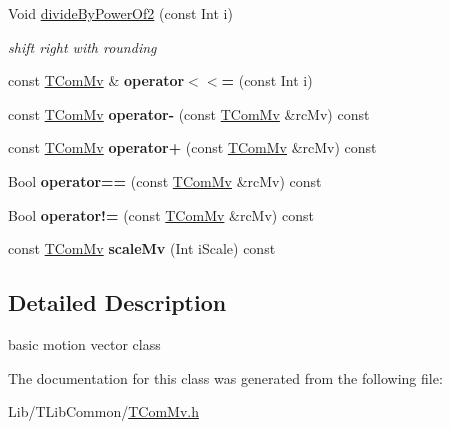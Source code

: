 \begin{DoxyCompactItemize}
\item 
\mbox{\label{class_t_com_mv_ac65379667de620878ffee5956f4b0862}} 
Void \hyperlink{class_t_com_mv_ac65379667de620878ffee5956f4b0862}{divide\+By\+Power\+Of2} (const Int i)
\begin{DoxyCompactList}\small\item\em shift right with rounding \end{DoxyCompactList}\item 
\mbox{\label{class_t_com_mv_a8f0c29162ea488bbb7688e47338b4da0}} 
const \hyperlink{class_t_com_mv}{T\+Com\+Mv} \& {\bfseries operator$<$$<$=} (const Int i)
\item 
\mbox{\label{class_t_com_mv_ac92eef6139ac791bb2e5eb5a4850b9a4}} 
const \hyperlink{class_t_com_mv}{T\+Com\+Mv} {\bfseries operator-\/} (const \hyperlink{class_t_com_mv}{T\+Com\+Mv} \&rc\+Mv) const
\item 
\mbox{\label{class_t_com_mv_a3430bf4109b589453164ac9f53791079}} 
const \hyperlink{class_t_com_mv}{T\+Com\+Mv} {\bfseries operator+} (const \hyperlink{class_t_com_mv}{T\+Com\+Mv} \&rc\+Mv) const
\item 
\mbox{\label{class_t_com_mv_a343f4a9ae678a94960813e603edc709a}} 
Bool {\bfseries operator==} (const \hyperlink{class_t_com_mv}{T\+Com\+Mv} \&rc\+Mv) const
\item 
\mbox{\label{class_t_com_mv_a17bb192264a070e57bb0614f4a410ff8}} 
Bool {\bfseries operator!=} (const \hyperlink{class_t_com_mv}{T\+Com\+Mv} \&rc\+Mv) const
\item 
\mbox{\label{class_t_com_mv_a49e68a254a4d0bcffc616f9d6f60b859}} 
const \hyperlink{class_t_com_mv}{T\+Com\+Mv} {\bfseries scale\+Mv} (Int i\+Scale) const
\end{DoxyCompactItemize}


\subsection{Detailed Description}
basic motion vector class 

The documentation for this class was generated from the following file\+:\begin{DoxyCompactItemize}
\item 
Lib/\+T\+Lib\+Common/\hyperlink{_t_com_mv_8h}{T\+Com\+Mv.\+h}\end{DoxyCompactItemize}
